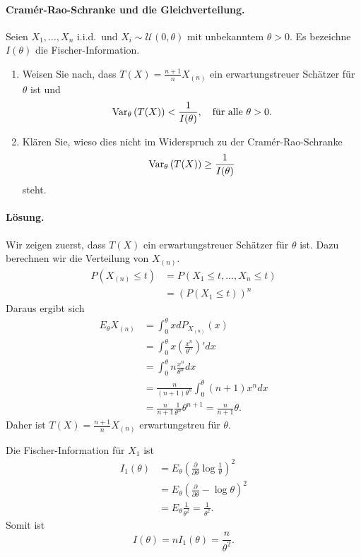 \paragraph{Cram\'er-Rao-Schranke und die Gleichverteilung.}   %
Seien $X_1,\ldots,X_n$ i.i.d.\ und $X_i \sim \mathcal U(0,\theta)$ mit unbekanntem 
$\theta > 0$. Es bezeichne $I(\theta)$ die Fischer-Information. 
\begin{enumerate}
    \item
Weisen Sie nach, dass
$T(X)=\frac{n+1}{n}X_{(n)}$ ein erwartungstreuer Schätzer für $\theta$ ist und
\begin{equation*}
	\operatorname{Var}_\theta \left( T(X) \right) < \frac{1}{I(\theta)}, \quad \textrm{für alle } \theta>0. 
\end{equation*}
    \item Klären Sie, wieso dies nicht im Widerspruch zu der Cram\'er-Rao-Schranke
\begin{equation*}
	\operatorname{Var}_\theta\left( T(X) \right) \geq \frac{1}{I(\theta)}
\end{equation*}
steht.
\end{enumerate}


\paragraph*{Lösung. } Wir zeigen zuerst, dass $T(X)$ ein erwartungstreuer Schätzer
für $\theta$ ist. Dazu berechnen wir die Verteilung von $X_{(n)}$.
\begin{align*}
    P\left( X_{(n)} \leq t \right) &= P\left( X_1\leq t,\ldots, X_n\leq t \right) \\
    &= \left( P(X_1 \leq t) \right)^n
\end{align*}
Daraus ergibt sich
\begin{align*}
    E_\theta X_{(n)} &= \int_{0}^{\theta} x dP_{ X_{(n)} }(x) \\
    &= \int_{0}^{\theta} x \left( \frac{x^n}{\theta^n} \right)' dx \\
    &= \int_{0}^{\theta} n \frac{x^n}{\theta^n} dx \\
    &= \frac{n}{(n+1)\theta^n} \int_{0}^{\theta} (n+1)x^n dx \\
    &= \frac{n}{n+1} \frac{1}{\theta^n} \theta^{n+1} = \frac{n}{n+1} \theta.
\end{align*}
Daher ist $T(X) = \frac{n+1}{n} X_{(n)}$ erwartungstreu für $\theta$.

Die Fischer-Information für $X_1$ ist 
\begin{align*}
    I_1(\theta) &= 
    E_\theta\left( \frac{\partial}{\partial \theta} \log \frac{1}{\theta} \right)^2 \\
    &= E_\theta \left( \frac{\partial}{\partial \theta} -\log \theta \right)^2 \\
    &= E_\theta \frac{1}{\theta^2} = \frac{1}{\theta^2}.
\end{align*}
Somit ist
\begin{equation*}
    I(\theta) = n I_1 \left( \theta \right) = \frac{n}{\theta^2}.
\end{equation*}

